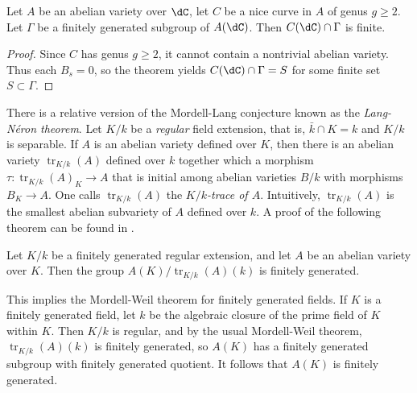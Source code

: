 \documentclass{article}
\begin{document}
\begin{corollary}
Let $A$ be an abelian variety over $\dC$, let $C$ be a nice curve in $A$ of 
genus $g\geqslant 2$. Let $\Gamma$ be a finitely generated subgroup of 
$A(\dC)$. Then $C(\dC)\cap \Gamma$ is finite. 
\end{corollary}
\begin{proof}
Since $C$ has genus $g\geqslant 2$, it cannot contain a nontrivial abelian 
variety. Thus each $B_s = 0$, so the theorem yields $C(\dC)\cap \Gamma = S$ 
for some finite set $S\subset \Gamma$. 
\end{proof}

There is a relative version of the Mordell-Lang conjecture known as the 
\emph{Lang-N\'eron theorem}. Let $K/k$ be a \emph{regular} field extension, 
that is, $\bar k\cap K = k$ and $K/k$ is separable. If $A$ is an abelian 
variety defined over $K$, then there is an abelian variety 
$\operatorname{tr}_{K/k}(A)$ defined over $k$ together which a morphism 
$\tau:\operatorname{tr}_{K/k}(A)_K\to A$ that is initial among abelian 
varieties $B/k$ with morphisms $B_K\to A$. One calls 
$\operatorname{tr}_{K/k}(A)$ the \emph{$K/k$-trace of $A$}. Intuitively, 
$\operatorname{tr}_{K/k}(A)$ is the smallest abelian subvariety of $A$ defined 
over $k$. A proof of the following theorem can be found in \cite{co06}. 

\begin{theorem}
Let $K/k$ be a finitely generated regular extension, and let $A$ be an abelian 
variety over $K$. Then the group $A(K)/\operatorname{tr}_{K/k}(A)(k)$ is 
finitely generated.
\end{theorem}

This implies the Mordell-Weil theorem for finitely generated fields. If $K$ is 
a finitely generated field, let $k$ be the algebraic closure of the prime field 
of $K$ within $K$. Then $K/k$ is regular, and by the usual Mordell-Weil 
theorem, $\operatorname{tr}_{K/k}(A)(k)$ is finitely generated, so $A(K)$ has a 
finitely generated subgroup with finitely generated quotient. It follows that 
$A(K)$ is finitely generated.
\end{document}
